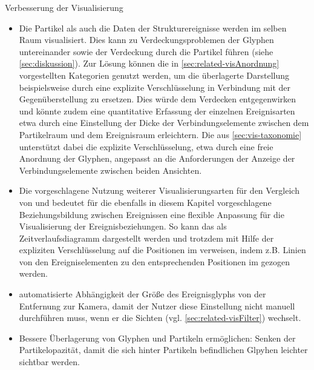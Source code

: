 Verbesserung der Visualisierung
\begin{itemize}
	\item Die Partikel als auch die Daten der Strukturereignisse werden im selben Raum visualisiert. Dies kann zu Verdeckungsproblemen der Glyphen untereinander sowie der Verdeckung durch die Partikel führen (siehe \autoref{sec:diskussion}). Zur Lösung können die in \autoref{sec:related-visAnordnung} vorgestellten Kategorien genutzt werden, um die überlagerte Darstellung beispielsweise durch eine explizite Verschlüsselung in Verbindung mit der Gegenüberstellung zu ersetzen. Dies würde dem Verdecken entgegenwirken und könnte zudem eine quantitative Erfassung der einzelnen Ereignisarten etwa durch eine Einstellung der Dicke der Verbindungselemente zwischen dem Partikelraum und dem Ereignisraum erleichtern. Die  aus \autoref{sec:vis-taxonomie} unterstützt dabei die explizite Verschlüsselung, etwa durch eine freie Anordnung der Glyphen, angepasst an die Anforderungen der Anzeige der Verbindungselemente zwischen beiden Ansichten.
	
	\item Die vorgeschlagene Nutzung weiterer Visualisierungsarten für den Vergleich von  und  bedeutet für die ebenfalls in diesem Kapitel vorgeschlagene Beziehungsbildung zwischen Ereignissen eine flexible Anpassung für die Visualisierung der Ereignisbeziehungen. So kann das  als Zeitverlaufsdiagramm dargestellt werden und trotzdem mit Hilfe der expliziten Verschlüsselung auf die Positionen im  verweisen, indem z.B. Linien von den Ereigniselementen zu den entsprechenden Positionen im  gezogen werden.
	
	
	\item automatisierte Abhängigkeit der Größe des Ereignisglyphs von der Entfernung zur Kamera, damit der Nutzer diese Einstellung nicht manuell durchführen muss, wenn er die Sichten (vgl. \autoref{sec:related-visFilter}) wechselt.

	\item Bessere Überlagerung von Glyphen und Partikeln ermöglichen: Senken der Partikelopazität, damit die sich hinter Partikeln befindlichen Glpyhen leichter sichtbar werden.

\end{itemize}

